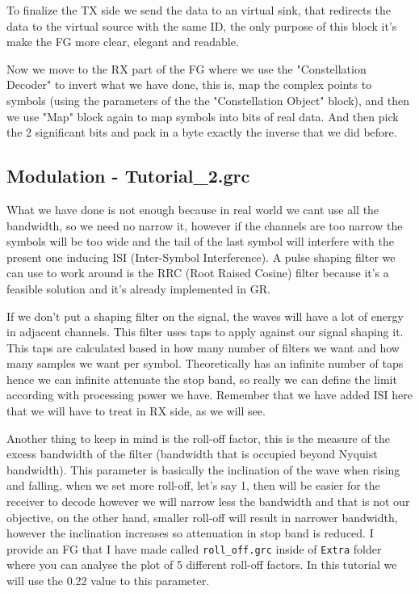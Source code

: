 \documentclass[a4paper, 10pt, conference]{ieeeconf}      %
\begin{document}
        To finalize the TX side we send the data to an virtual sink, that redirects the data to the virtual source with the same ID, the only purpose of this block it's make the FG more clear, elegant and readable.
        
        Now we move to the RX part of the FG where we use the "Constellation Decoder" to invert what we have done, this is, map the complex points to symbols (using the parameters of the the "Constellation Object" block), and then we use "Map" block again to map symbols into bits of real data. And then pick the 2 significant bits and pack in a byte exactly the inverse that we did before.
        
        
\subsection{Modulation - Tutorial\_2.grc}
    What we have done is not enough because in real world we cant use all the bandwidth, so we need no narrow it, however if the channels are too narrow the symbols will be too wide and the tail of the last symbol will interfere with the present one inducing ISI (Inter-Symbol Interference). A pulse shaping filter we can use to work around is the RRC (Root Raised Cosine) filter because it's a feasible solution and it's already implemented in GR.      
    
   If we don't put a shaping filter on the signal, the waves will have a lot of energy in adjacent channels. This filter uses taps to apply against our signal shaping it. This taps are calculated based in how many number of filters we want and how many samples we want per symbol. Theoretically has an infinite number of taps hence we can infinite attenuate the stop band, so really we can define the limit according with processing power we have. Remember that we have added ISI here that we will have to treat in RX side, as we will see.
   

    
    Another thing to keep in mind is the roll-off factor, this is the measure of the excess bandwidth of the filter (bandwidth that is occupied beyond Nyquist bandwidth). This parameter is basically the inclination of the wave when rising and falling, when we set more roll-off, let's say 1, then will be easier for the receiver to decode however we will narrow less the bandwidth and that is not our objective, on the other hand, smaller roll-off will result in narrower bandwidth, however the inclination increases so attenuation in stop band is reduced.
    I provide an FG that I have made called \verb|roll_off.grc| inside of \verb|Extra| folder where you can analyse the plot of 5 different roll-off factors. In this tutorial we will use the 0.22 value to this parameter.
    
\end{document}
